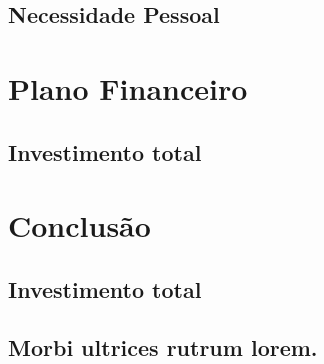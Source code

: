 \documentclass[
	12pt,				%
	openright,			%
	twoside,			%
	a4paper,			%
	english,			%
	french,				%
	spanish,			%
	brazil,				%
	]{abntex2}
\begin{document}
\section{Necessidade Pessoal}



\chapter{Plano Financeiro}

\section{Investimento total}



\chapter{Conclusão}

\section{Investimento total}

	



\begin{anexosenv}

\partanexos

\chapter{Morbi ultrices rutrum lorem.}
\lipsum[30]


\end{anexosenv}



\printindex

\end{document}
